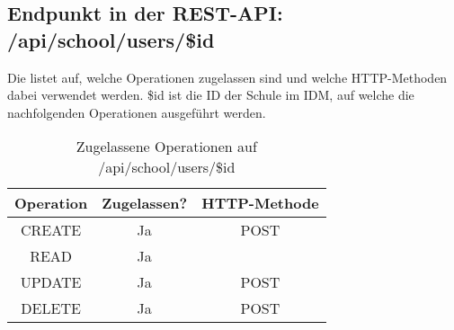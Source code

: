 \subsection{Endpunkt in der REST-API: /api/school/users/\$id}
Die  listet auf, welche Operationen zugelassen sind und welche HTTP-Methoden dabei verwendet werden. 
\$id ist die ID der Schule im IDM, auf welche die nachfolgenden Operationen ausgeführt werden.

\begin{table}[!htbp]
	\begin{tabular}{|c|c|c|}
		\hline
			\textbf{Operation} & \textbf{Zugelassen?} & \textbf{HTTP-Methode} \\ \hline
			CREATE & Ja & POST \\ \hline 
			READ & Ja &  \\ \hline
			UPDATE & Ja & POST \\ \hline 
			DELETE & Ja & POST \\ \hline
	\end{tabular}

		\caption{Zugelassene Operationen auf /api/school/users/\$id}
		\label{tab:end:rest:api:school:users:id:meth}
\end{table}





